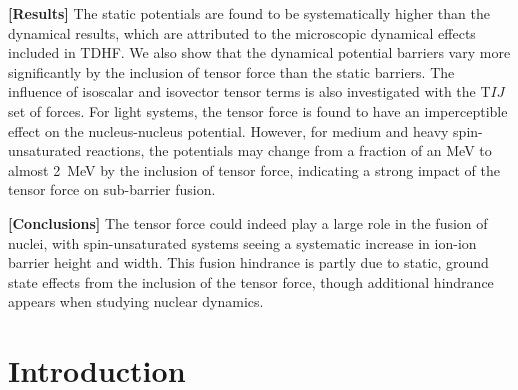 		{\bf [Results]}
The static potentials are found to be systematically higher than the dynamical results, which are attributed to the microscopic dynamical effects included in TDHF.
We also show that the dynamical potential barriers vary more significantly by the inclusion of tensor force than the static barriers.
The influence of isoscalar and isovector tensor terms is also investigated with the T$IJ$ set of forces.
For light systems, the tensor force is found to have an imperceptible effect on the nucleus-nucleus potential. However, for medium and heavy spin-unsaturated reactions,
the potentials may change from a fraction of an MeV to almost 2~MeV by the inclusion of tensor force, indicating a strong impact of the tensor force on sub-barrier fusion.
		
		{\bf [Conclusions]}
		The tensor force could indeed play a large role in the fusion of nuclei, with spin-unsaturated systems seeing a systematic increase in ion-ion barrier height and width. This fusion hindrance is partly due to static, ground state effects from the inclusion of the tensor force, though additional hindrance appears when studying nuclear dynamics.







\section{Introduction}
\label{introduction}

